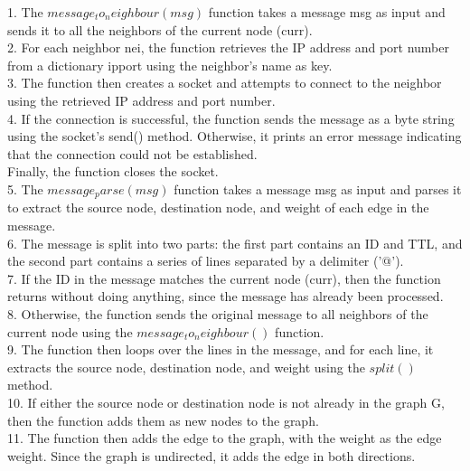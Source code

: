 \documentclass[11pt]{article}
\begin{document}
    1. The $message_to_neighbour(msg)$ function takes a message msg as input and sends it to all the neighbors of the current node (curr).\\

    2.  For each neighbor nei, the function retrieves the IP address and port number from a dictionary ipport using the neighbor's name as key.\\

    3. The function then creates a socket and attempts to connect to the neighbor using the retrieved IP address and port number.\\

    4.  If the connection is successful, the function sends the message as a byte string using the socket's send() method. Otherwise, it prints an error message indicating that the connection could not be established.\\

    Finally, the function closes the socket.\\

    5. The $message_parse(msg)$ function takes a message msg as input and parses it to extract the source node, destination node, and weight of each edge in the message.\\

    6. The message is split into two parts: the first part contains an ID and TTL, and the second part contains a series of lines separated by a delimiter ('@').\\

    7. If the ID in the message matches the current node (curr), then the function returns without doing anything, since the message has already been processed.\\

    8. Otherwise, the function sends the original message to all neighbors of the current node using the $message_to_neighbour()$ function.\\

    9. The function then loops over the lines in the message, and for each line, it extracts the source node, destination node, and weight using the $split()$ method.\\

    10. If either the source node or destination node is not already in the graph G, then the function adds them as new nodes to the graph.\\

    11. The function then adds the edge to the graph, with the weight as the edge weight. Since the graph is undirected, it adds the edge in both directions.\\
\end{document}
